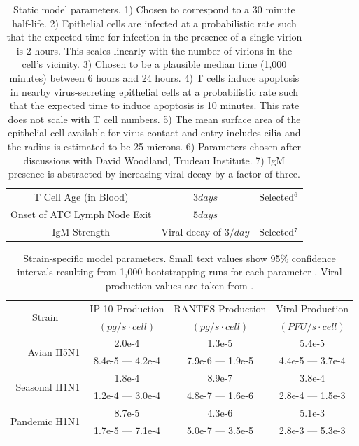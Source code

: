 \documentclass[10pt]{article}
\begin{document}
\begin{table}
\begin{center}
\begin{tabular}{ | c | c | c | }
  T Cell Age (in Blood) & $3 days$ & Selected$^6$ \\
  Onset of ATC Lymph Node Exit & $5 days$ & \cite{Banerjee2011} \\
  IgM Strength & Viral decay of $3/day$ & Selected$^7$ \\
  \hline  
\end{tabular}
\caption{Static model parameters.  1) Chosen to correspond to a 30 minute half-life.  2) Epithelial cells are infected at a probabilistic rate such that the expected time for infection in the presence of a single virion is 2 hours.  This scales linearly with the number of virions in the cell's vicinity.  3) Chosen to be a plausible median time (1,000 minutes) between 6 hours and 24 hours.  4) T cells induce apoptosis in nearby virus-secreting epithelial cells at a probabilistic rate such that the expected time to induce apoptosis is 10 minutes.  This rate does not scale with T cell numbers.  5)  The mean surface area of the epithelial cell available for virus contact and entry includes cilia and the radius is estimated to be 25 microns. 6) Parameters chosen after discussions with David Woodland, Trudeau Institute.  7) IgM presence is abstracted by increasing viral decay by a factor of three. }
\label{table:parameters}
\end{center}
\end{table}



\begin{table}
\centering
\begin{tabular}{ | r | c | c | c | }
  \hline                        
  \multicolumn{1}{|c|}{\multirow{2}{*}{Strain}} & IP-10 Production & RANTES Production & Viral Production \\
   & \footnotesize{$(pg/s\cdot cell)$}  & \footnotesize{$(pg/s\cdot cell)$} &  \footnotesize{$(PFU/s\cdot cell)$} \\
  \hline
  \multirow{2}{*}{Avian H5N1} & 2.0e-4 &  1.3e-5 & 5.4e-5 \\
   &  \footnotesize{8.4e-5 --- 4.2e-4} & \footnotesize{7.9e-6 --- 1.9e-5} & \footnotesize{4.4e-5 --- 3.7e-4}\\ 
   \hline
  \multirow{2}{*}{Seasonal H1N1} & 1.8e-4 &  8.9e-7 & 3.8e-4 \\
   & \footnotesize{1.2e-4 --- 3.0e-4} & \footnotesize{4.8e-7 --- 1.6e-6} & \footnotesize{2.8e-4 --- 1.5e-3}\\
   \hline
  \multirow{2}{*}{Pandemic H1N1} & 8.7e-5 &  4.3e-6 & 5.1e-3 \\
   & \footnotesize{1.7e-5 --- 7.1e-4} & \footnotesize{5.0e-7 --- 3.5e-5} & \footnotesize{2.8e-3 --- 5.3e-3} \\
  \hline
\end{tabular}
\caption{Strain-specific model parameters.  Small text values show 95\% confidence intervals resulting from 1,000 bootstrapping runs for each parameter \cite{Wu1986}.  Viral production values are taken from \cite{Mitchell2011}.}
\label{table:strains}
\end{table}
\end{document}
